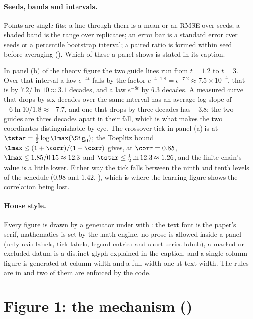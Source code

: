 \paragraph{Seeds, bands and intervals.} Points are single fits; a line through them is
a mean or an RMSE over seeds; a shaded band is the range over replicates; an error bar
is a standard error over seeds or a percentile bootstrap interval; a paired ratio is
formed within seed before averaging (). Which of these
a panel shows is stated in its caption.

\begin{example}
\label{ex:reading-slopes}
In panel (b) of the theory figure the two guide lines run from $t=1.2$ to $t=3$. Over
that interval a law $e^{-4t}$ falls by the factor $e^{-4\cdot1.8}=e^{-7.2}\approx7.5\times10^{-4}$,
that is by $7.2/\ln10\approx3.1$ decades, and a law $e^{-8t}$ by $6.3$ decades. A measured
curve that drops by six decades over the same interval has an average log-slope of
$-6\ln10/1.8\approx-7.7$, and one that drops by three decades has $-3.8$: the two guides
are three decades apart in their fall, which is what makes the two coordinates
distinguishable by eye. The crossover tick in panel (a) is at
$\tstar=\tfrac12\log\lmax(\Sig_0)$; the Toeplitz bound $\lmax\le(1+\corr)/(1-\corr)$ gives,
at $\corr=0.85$, $\lmax\le1.85/0.15\approx12.3$ and $\tstar\le\tfrac12\ln12.3\approx1.26$,
and the finite chain's value is a little lower. Either way the tick falls between the
ninth and tenth levels of the schedule ($0.98$ and $1.42$, ), which is
where the learning figure shows the correlation being lost.
\end{example}

\paragraph{House style.} Every figure is drawn by a generator under  with
: the text font is the paper's serif, mathematics is set by the
math engine, no prose is allowed inside a panel (only axis labels, tick labels, legend
entries and short series labels), a marked or excluded datum is a distinct glyph
explained in the caption, and a single-column figure is generated at column width and a
full-width one at text width. The rules are in 
and two of them are enforced by the code.

\section{Figure 1: the mechanism ()}
\label{sec:fig-mechanism}

